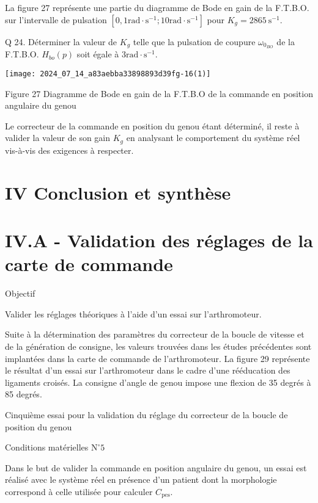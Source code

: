 La figure 27 représente une partie du diagramme de Bode en gain de la F.T.B.O. sur l'intervalle de pulsation $\left[0,1 \mathrm{rad} \cdot \mathrm{s}^{-1} ; 10 \mathrm{rad} \cdot \mathrm{s}^{-1}\right]$ pour $K_{g}=2865 \mathrm{~s}^{-1}$.

Q 24. Déterminer la valeur de $K_{g}$ telle que la pulsation de coupure $\omega_{0_{B O}}$ de la F.T.B.O. $H_{b o}(p)$ soit égale à $3 \mathrm{rad} \cdot \mathrm{s}^{-1}$.

\begin{center}
\texttt{[image: 2024\_07\_14\_a83aebba33898893d39fg-16(1)]}
\end{center}

Figure 27 Diagramme de Bode en gain de la F.T.B.O de la commande en position angulaire du genou

Le correcteur de la commande en position du genou étant déterminé, il reste à valider la valeur de son gain $K_{g}$ en analysant le comportement du système réel vis-à-vis des exigences à respecter.

\section*{IV Conclusion et synthèse}
\section*{IV.A - Validation des réglages de la carte de commande}
Objectif

Valider les réglages théoriques à l'aide d'un essai sur l'arthromoteur.

Suite à la détermination des paramètres du correcteur de la boucle de vitesse et de la génération de consigne, les valeurs trouvées dans les études précédentes sont implantées dans la carte de commande de l'arthromoteur. La figure 29 représente le résultat d'un essai sur l'arthromoteur dans le cadre d'une rééducation des ligaments croisés. La consigne d'angle de genou impose une flexion de 35 degrés à 85 degrés.

Cinquième essai pour la validation du réglage du correcteur de la boucle de position du genou

Conditions matérielles $\mathrm{N}^{\circ} 5$

Dans le but de valider la commande en position angulaire du genou, un essai est réalisé avec le système réel en présence d'un patient dont la morphologie correspond à celle utilisée pour calculer $C_{\mathrm{pes}}$.

